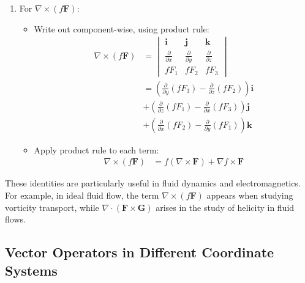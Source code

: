 \begin{example}
\begin{solution}
\begin{enumerate}
\begin{itemize}
   \item Collect terms and recognize the dot product pattern:
   \[
   \nabla \cdot (\mathbf{F} \times \mathbf{G}) = \mathbf{G} \cdot (\nabla \times \mathbf{F}) - \mathbf{F} \cdot (\nabla \times \mathbf{G})
   \]
\end{itemize}

\item For $\nabla \times (f\mathbf{F})$:
\begin{itemize}
   \item Write out component-wise, using product rule:
   \begin{align*}
   \nabla \times (f\mathbf{F}) &= \begin{vmatrix}
   \mathbf{i} & \mathbf{j} & \mathbf{k} \\
   \frac{\partial}{\partial x} & \frac{\partial}{\partial y} & \frac{\partial}{\partial z} \\
   fF_1 & fF_2 & fF_3
   \end{vmatrix} \\[1em]
   &= \left(\frac{\partial}{\partial y}(fF_3) - \frac{\partial}{\partial z}(fF_2)\right)\mathbf{i} \\
   &+ \left(\frac{\partial}{\partial z}(fF_1) - \frac{\partial}{\partial x}(fF_3)\right)\mathbf{j} \\
   &+ \left(\frac{\partial}{\partial x}(fF_2) - \frac{\partial}{\partial y}(fF_1)\right)\mathbf{k}
   \end{align*}

   \item Apply product rule to each term:
   \begin{align*}
   \nabla \times (f\mathbf{F}) &= f(\nabla \times \mathbf{F}) + \nabla f \times \mathbf{F}
   \end{align*}
\end{itemize}

\end{enumerate}

\noindent These identities are particularly useful in fluid dynamics and electromagnetics. For example, in ideal fluid flow, the term $\nabla \times (f\mathbf{F})$ appears when studying vorticity transport, while $\nabla \cdot (\mathbf{F} \times \mathbf{G})$ arises in the study of helicity in fluid flows.

\end{solution}
\end{example}
\exampleline


\subsection*{Vector Operators in Different Coordinate Systems}

